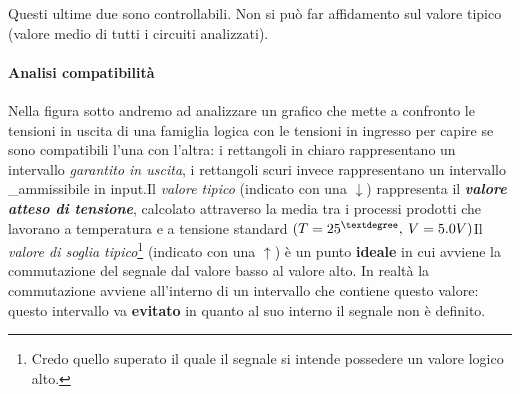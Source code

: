 \documentclass[
]{book}
\begin{document}
Questi ultime due sono controllabili. Non si può far affidamento sul
valore tipico (valore medio di tutti i circuiti analizzati).

\paragraph{Analisi compatibilità}\label{analisi-compatibilituxe0}

Nella figura sotto andremo ad analizzare un grafico che mette a
confronto le tensioni in uscita di una famiglia logica con le tensioni
in ingresso per capire se sono compatibili l'una con l'altra: i
rettangoli in chiaro rappresentano un intervallo \emph{garantito in
uscita}, i rettangoli scuri invece rappresentano un intervallo
\_ammissibile in input.\newline Il \emph{valore tipico} (indicato con
una \(\downarrow\)) rappresenta il \textbf{\emph{valore atteso di
tensione}}, calcolato attraverso la media tra i processi prodotti che
lavorano a temperatura e a tensione standard
\((T=25^{\textdegree},\:V=5.0V)\)\newline Il \emph{valore di soglia
tipico}\footnote{Credo quello superato il quale il segnale si intende
  possedere un valore logico alto.} (indicato con una \(\uparrow\)) è un
punto \textbf{ideale} in cui avviene la commutazione del segnale dal
valore basso al valore alto. In realtà la commutazione avviene
all'interno di un intervallo che contiene questo valore: questo
intervallo va \textbf{evitato} in quanto al suo interno il segnale non è
definito.
\end{document}
